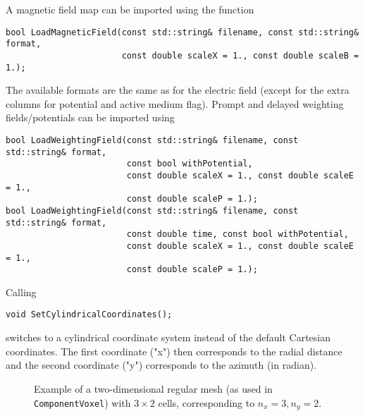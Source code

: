 A magnetic field map can be imported using the function
\begin{lstlisting}
bool LoadMagneticField(const std::string& filename, const std::string& format,
                       const double scaleX = 1., const double scaleB = 1.);
\end{lstlisting}
The available formats are the same as for the electric field (except for the 
extra columns for potential and active medium flag).
Prompt and delayed weighting fields/potentials can be imported using
\begin{lstlisting}
bool LoadWeightingField(const std::string& filename, const std::string& format,
                        const bool withPotential,
                        const double scaleX = 1., const double scaleE = 1.,
                        const double scaleP = 1.);
bool LoadWeightingField(const std::string& filename, const std::string& format,
                        const double time, const bool withPotential,
                        const double scaleX = 1., const double scaleE = 1.,
                        const double scaleP = 1.);
\end{lstlisting}

Calling 
\begin{lstlisting}
void SetCylindricalCoordinates();
\end{lstlisting}
switches to a cylindrical coordinate system instead of the default Cartesian coordinates.
The first coordinate ("x") then corresponds to the radial distance 
and the second coordinate ("y") corresponds to the azimuth (in radian).

\begin{figure}
  \centering
  \caption{Example of a two-dimensional regular mesh (as used in 
           \texttt{ComponentVoxel}) with $3\times2$ cells, 
           corresponding to $n_{x} = 3, n_{y} = 2$.} 
  \label{Fig:MeshComponentVoxel}
\end{figure}


